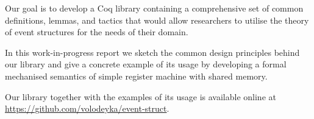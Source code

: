 Our goal is to develop a Coq library containing 
a comprehensive set of common definitions, lemmas, 
and tactics that would allow researchers 
to utilise the theory of event structures 
for the needs of their domain.

In this work-in-progress report we sketch 
the common design principles behind our library
and give a concrete example of its usage  
by developing a formal mechanised semantics of simple 
register machine with shared memory.

Our library together with the examples of 
its usage is available online at \url{https://github.com/volodeyka/event-struct}.  
